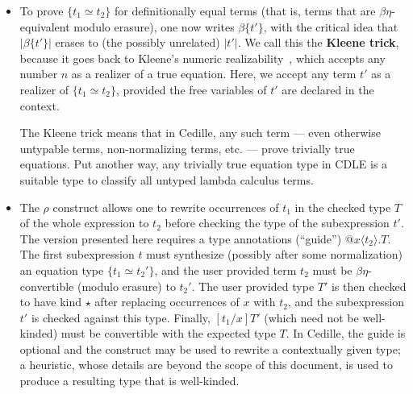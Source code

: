 \documentclass{article}
\begin{document}
\begin{itemize}
\item To prove $\{ t_1 \simeq t_2\}$ for definitionally equal terms (that is,
  terms that are \(\beta\eta\)-equivalent modulo erasure), one now writes $\beta\{t'\}$,
  with the critical idea that $|\beta\{t'\}|$ erases to (the possibly unrelated) $|t'|$.
  We call this the \textbf{Kleene trick}, because it goes back to Kleene's numeric
  realizability~\cite{Kle65_Classical-Extensions-of-Intuitionistic-Mathematics},
  which accepts any number $n$ as a realizer 
  of a true equation.  Here, we accept any term $t'$ as a realizer of $\{ t_1
  \simeq t_2\}$, provided the free variables of \(t'\) are declared in the
  context.
  
  The Kleene trick means that in Cedille, any such term --- even otherwise untypable
  terms, non-normalizing terms, etc. --- prove trivially true equations.
  Put another way, any trivially true equation type in CDLE is a suitable type
  to classify all untyped lambda calculus terms.
\item The \(\rho\) construct allows one to rewrite occurrences of \(t_1\) in the
  checked type \(T\) of the whole expression to \(t_2\) before checking
  the type of the subexpression \(t'\).
  The version presented here requires a type annotations (``guide'') \(@x\langle
  t_2 \rangle.T\).
  The first subexpression \(t\) must synthesize (possibly after some
  normalization) an equation type \(\{t_1 \simeq t_2'\}\), and the user provided
  term \(t_2\) must be \(\beta\eta\)-convertible (modulo erasure) to \(t_2'\).
  The user provided type \(T'\) is then checked to have kind \(\star\) after
  replacing occurrences of \(x\) with \(t_2\), and the subexpression \(t'\) is
  checked against this type.
  Finally, \([t_1/x]T'\) (which need not be well-kinded) must be convertible
  with the expected type \(T\).
  In Cedille, the guide is optional and the construct may be used to rewrite a
  contextually given type; a heuristic, whose details are beyond the scope of
  this document, is used to produce a resulting type that is well-kinded.


\end{itemize}
\end{document}

